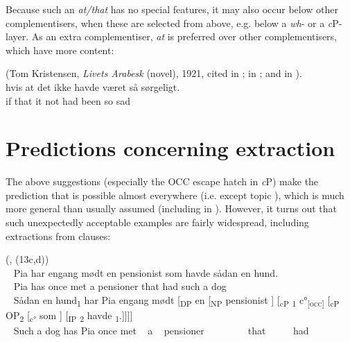 \documentclass[output=paper]{LSP/langsci}
\begin{document}
Because such an \textit{at/that} has no special features, it may also occur below other complementisers, when these are selected from above, e.g. below a \textit{wh}{}- or a  \textit{c}P-layer. As an extra complementiser, \textit{at} is preferred over other complementisers, which have more content:

\ea%
    \label{ex:vikner:16}
   (Tom Kristensen, \textit{Livets Arabesk} (novel), 1921, cited in \citealt[III: 388]{Hansen1967}; in \citealt[122,  (149c)]{Vikner1995}; and in \citealt[368, (10)]{Nyvad2016}).\\  
      { hvis }  { at }  { det }  { ikke }  { havde }  { været }  { så }  { sørgeligt. }\\
	 {  }  { {if } }  { {that } }  { {it } }  { {not } }  { {had} }  { {been} }  { {so} }  { {sad}}\\     
    \z

\section{  Predictions concerning extraction}

The above suggestions (especially the OCC escape hatch in \textit{c}P) make the prediction that  is possible almost everywhere (i.e. except topic ), which is much more general than usually assumed (including in \citealt{Vikner1995}). However, it turns out that such unexpectedly acceptable examples are fairly widespread, including extractions from  clauses:

\ea%
    \label{ex:vikner:17}
    
      (\citealt[35]{ChristensenNyvad2014}, (13c,d))\\
\ea
    \gll  ~   { Pia }  { har }  { engang }  { mødt }  { en }  { pensionist }  { som }  { havde }  { sådan }  { en }  { hund.}\\
	 ~   { {Pia} }  { {has} }  { {once} }  { {met} }  { {a} }  { {pensioner} }  { {that} }  { {had} }  { {such} }  { {a} }  { {dog}}\\
\ex	 
\gll	 ~   { Sådan en hund\textsubscript{1} }  { har }  { Pia }  { engang }  { mødt }  { [\textsubscript{DP} }  { en }  { [\textsubscript{NP} }  { pensionist }  { ] }  { [{\textsubscript{c}}\textsubscript{P} {\longrule}\textsubscript{1}  {c°}\textsubscript{[}\textsc{\textsubscript{occ}}\textsubscript{]} }  { [{\textsubscript{c}}\textsubscript{P } }  { OP\textsubscript{2} }  { [{\textsubscript{c°}} }  { som }  { ] }  { [\textsubscript{IP} }  { {\longrule}\textsubscript{2} }  { havde }  { {\longrule}\textsubscript{1}.]]]]}\\
 ~   { {Such a dog} }  { {has} }  { {Pia} }  { {once} }  { {met} }   ~   { {a} }   ~   { {pensioner} }   ~    ~    ~    ~    ~   { {that} }   ~    ~    ~   { {had} }  { }\\
\end{document}

